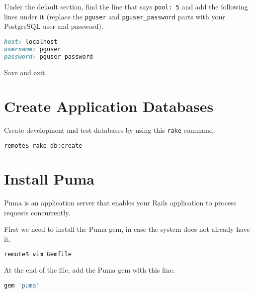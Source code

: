 Under the default section, find the line that says \texttt{pool: 5}
and add the following lines under it
(replace the \texttt{pguser} and \texttt{pguser\_password}
parts with your PostgreSQL user and password).

\begin{minipage}{\linewidth}
  \begin{lstlisting}[language=ruby, caption={config/database.yml}]
host: localhost
username: pguser
password: pguser_password
\end{lstlisting}
\end{minipage}

Save and exit.

\section{Create Application Databases}

Create development and test databases by using this \texttt{rake} command.

\begin{minipage}{\linewidth}
\begin{lstlisting}[language=bash]
remote$ rake db:create
\end{lstlisting}
\end{minipage}

\section{Install Puma}

Puma is an application server that enables your Rails application
to process requests concurrently.

First we need to install the Puma gem, in case the system does not
already have it.

\begin{minipage}{\linewidth}
\begin{lstlisting}[language=bash]
remote$ vim Gemfile
\end{lstlisting}
\end{minipage}

At the end of the file, add the Puma gem with this line.

\begin{minipage}{\linewidth}
  \begin{lstlisting}[language=ruby, caption={Gemfile}]
gem 'puma'
\end{lstlisting}
\end{minipage}

